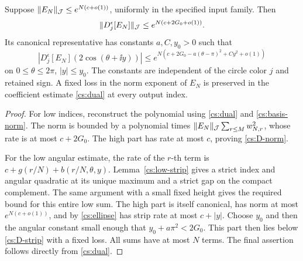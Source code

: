 \begin{proposition}\label{cs:decorated-turn}
Suppose \(\lVert E_N\rVert_{\mathcal J}\le e^{N(c+o(1))}\), uniformly in the specified
input family. Then
\begin{equation}\label{cs:D-norm}
 \lVert D_j^\epsilon[E_N]\rVert_{\mathcal J}\le e^{N(c+2G_0+o(1))}.
\end{equation}
Its canonical representative has constants \(a,C,y_0>0\) such that
\begin{equation}\label{cs:D-strip}
 |D_j^\epsilon[E_N](2\cos(\theta+\ii y))|
 \le e^{N(c+2G_0-a(\theta-\pi)^2+Cy^2+o(1))}
\end{equation}
on \(0\le\theta\le2\pi\), \(|y|\le y_0\). The constants are
independent of the circle color \(j\) and retained sign.
A fixed loss in the norm exponent of \(E_N\) is preserved in the
coefficient estimate \eqref{cs:dual} at every output index.
\end{proposition}
\begin{proof}
For low indices, reconstruct the polynomial using
\eqref{cs:dual} and \eqref{cs:basis-norm}. The norm is bounded by
a polynomial times
\(\lVert E_N\rVert_{\mathcal J}\sum_{r\le M}w_{N,r}^2\), whose rate is at most
\(c+2G_0\). The high part has rate at most \(c\), proving
\eqref{cs:D-norm}.

For the low angular estimate, the rate of the \(r\)-th term is
\(c+g(r/N)+b(r/N,\theta,y)\). Lemma~\ref{cs:low-strip} gives
a strict index and angular quadratic at its unique maximum and a
strict gap on the compact complement. The same argument with a small
fixed height gives the required bound for this entire low sum. The
high part is itself canonical, has norm at most \(e^{N(c+o(1))}\),
and by \eqref{cs:ellipse} has strip rate at most \(c+|y|\).
Choose \(y_0\) and then the angular constant small enough that
\(y_0+a\pi^2<2G_0\). This part then lies below
\eqref{cs:D-strip} with a fixed loss. All sums have at most \(N\)
terms. The final assertion follows directly from \eqref{cs:dual}.
\end{proof}

